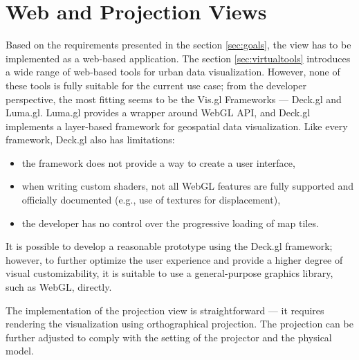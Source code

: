 \section{Web and Projection Views}
Based on the requirements presented in the section \ref{sec:goals}, the view has to be implemented as a web-based application. The section \ref{sec:virtualtools} introduces a wide range of web-based tools for urban data visualization. However, none of these tools is fully suitable for the current use case; from the developer perspective, the most fitting seems to be the Vis.gl Frameworks --- Deck.gl and Luma.gl. Luma.gl provides a wrapper around WebGL API, and Deck.gl implements a layer-based framework for geospatial data visualization. Like every framework, Deck.gl also has limitations: 
\begin{itemize}[noitemsep]
    \item the framework does not provide a way to create a user interface,
    \item when writing custom shaders, not all WebGL features are fully supported and officially documented (e.g., use of textures for displacement),
    \item the developer has no control over the progressive loading of map tiles.
\end{itemize}
It is possible to develop a reasonable prototype using the Deck.gl framework; however, to further optimize the user experience and provide a higher degree of visual customizability, it is suitable to use a general-purpose graphics library, such as WebGL, directly.

The implementation of the projection view is straightforward --- it requires rendering the visualization using orthographical projection. The projection can be further adjusted to comply with the setting of the projector and the physical model. 





